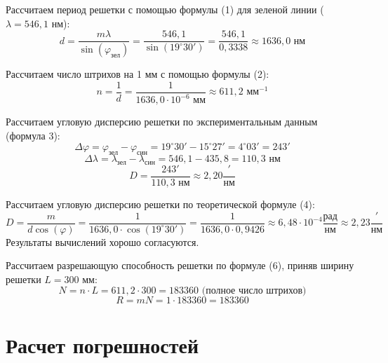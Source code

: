 \documentclass[a4paper,12pt]{article}
\begin{document}
\noindent Рассчитаем период решетки с помощью формулы (1) для зеленой линии ($\lambda = 546,1$ нм):
\begin{equation*}
d = \frac{m\lambda}{\sin(\varphi_{зел})} = \frac{546,1}{\sin(19^\circ 30')} = \frac{546,1}{0,3338} \approx 1636,0 \text{ нм}
\end{equation*}

\noindent Рассчитаем число штрихов на 1 мм с помощью формулы (2):
\begin{equation*}
n = \frac{1}{d} = \frac{1}{1636,0 \cdot 10^{-6} \text{ мм}} \approx 611,2 \text{ мм}^{-1}
\end{equation*}

\noindent Рассчитаем угловую дисперсию решетки по экспериментальным данным (формула 3):
\begin{equation*}
\Delta\varphi = \varphi_{зел} - \varphi_{син} = 19^\circ 30' - 15^\circ 27' = 4^\circ 03' = 243'
\end{equation*}
\begin{equation*}
\Delta\lambda = \lambda_{зел} - \lambda_{син} = 546,1 - 435,8 = 110,3 \text{ нм}
\end{equation*}
\begin{equation*}
D = \frac{243'}{110,3 \text{ нм}} \approx 2,20 \frac{'}{\text{нм}}
\end{equation*}

\noindent Рассчитаем угловую дисперсию решетки по теоретической формуле (4):
\begin{equation*}
D = \frac{m}{d \cos(\varphi)} = \frac{1}{1636,0 \cdot \cos(19^\circ 30')} = \frac{1}{1636,0 \cdot 0,9426} \approx 6,48 \cdot 10^{-4} \frac{\text{рад}}{\text{нм}} \approx 2,23 \frac{'}{\text{нм}}
\end{equation*}
Результаты вычислений хорошо согласуются.

\noindent Рассчитаем разрешающую способность решетки по формуле (6), приняв ширину решетки $L = 300$ мм:
\begin{equation*}
N = n \cdot L = 611,2 \cdot 300 = 183360 \text{ (полное число штрихов)}
\end{equation*}
\begin{equation*}
R = mN = 1 \cdot 183360 = 183360
\end{equation*}




\section{Расчет погрешностей}
\end{document}
